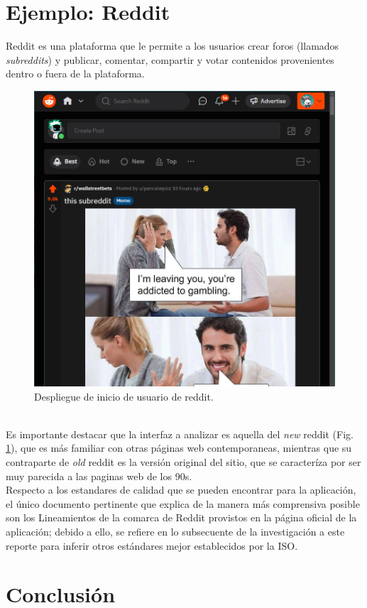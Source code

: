 \section{Ejemplo: Reddit}
Reddit es una plataforma que le permite a los usuarios crear foros (llamados \emph{subreddits}) y
publicar, comentar, compartir y votar contenidos provenientes dentro o fuera de la plataforma.
\begin{figure}[t]
    \centering
    \includegraphics[scale=0.33]{../images/fig2.png}
    \caption{Despliegue de inicio de usuario de reddit.}
    \label{fig:fig2}    
\end{figure}
\\

Es importante destacar que la interfaz a analizar es aquella del \emph{new} reddit (Fig. \ref{fig:fig2}), que es
más familiar con otras páginas web contemporaneas, mientras que su contraparte de \emph{old}
reddit es la versión original del sitio, que se caracteríza por ser muy parecida a las paginas
web de los 90s.
\\

Respecto a los estandares de calidad que se pueden encontrar para la aplicación, el único documento pertinente
que explica de la manera más comprensiva posible son los Lineamientos de la comarca de Reddit %
provistos en la página oficial de la aplicación; debido a ello, se refiere en lo subsecuente de la investigación
a este reporte para inferir otros estándares mejor establecidos por la ISO.

\section{Conclusión}


